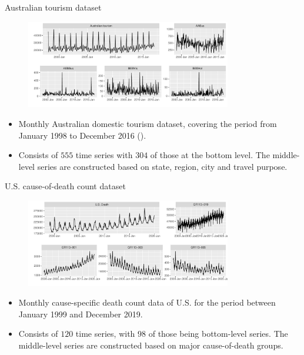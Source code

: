 \documentclass[aspectratio=169]{beamer}
\begin{document}
\begin{frame}{Australian tourism dataset}
	\begin{figure}
		\includegraphics[width=0.8\textwidth]{../manuscript/figures/tourism.pdf}
	\end{figure}
	\begin{itemize}
		\item Monthly Australian domestic tourism dataset, covering the period from January 1998 to December 2016 (\citealp{wickramasuriyaOptimalForecastReconciliation2019}).
		\item Consists of $555$ time series with $304$ of those at the bottom level. The middle-level series are constructed based on state, region, city and travel purpose.
	\end{itemize}
	
\end{frame}

\begin{frame}{U.S. cause-of-death count dataset}
	\begin{figure}
		\includegraphics[width=0.8\textwidth]{../manuscript/figures/mortality.pdf}
	\end{figure}
	\begin{itemize}
		\item Monthly cause-specific death count data of U.S. for the period between January 1999 and December 2019.
		\item Consists of $120$ time series, with $98$ of those being bottom-level series. The middle-level series are constructed based on major cause-of-death groups.
	\end{itemize}
\end{frame}
\end{document}
